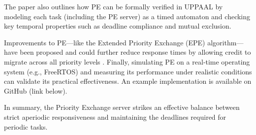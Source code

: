 \documentclass[conference]{IEEEtran}
\begin{document}
The paper also outlines how PE can be formally verified in UPPAAL by modeling each task (including the PE server) as a timed automaton and checking key temporal properties such as deadline compliance and mutual exclusion.

Improvements to PE—like the Extended Priority Exchange (EPE) algorithm—have been proposed and could further reduce response times by allowing credit to migrate across all priority levels \cite{sprunt1990aperiodic}. Finally, simulating PE on a real‐time operating system (e.g., FreeRTOS) and measuring its performance under realistic conditions can validate its practical effectiveness. An example implementation is available on GitHub (link below)\cite{fifo:priorityexchange}.

In summary, the Priority Exchange server strikes an effective balance between strict aperiodic responsiveness and maintaining the deadlines required for periodic tasks.



\end{document}
